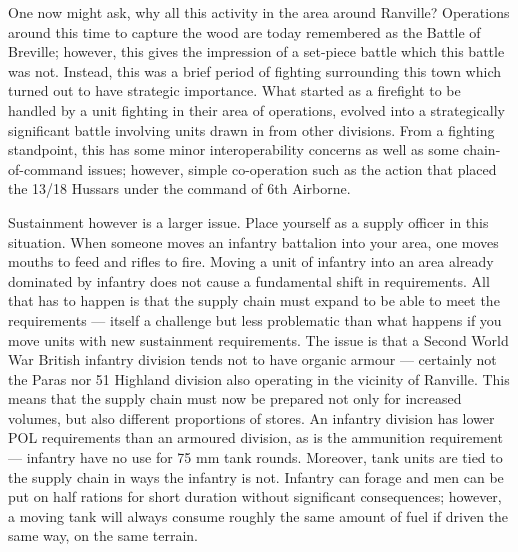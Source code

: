 \documentclass[noraggedright]{turabian-researchpaper}
\begin{document}

One now might ask, why all this activity in the area around Ranville?  
Operations around this time to capture the wood are today remembered as the
Battle of Breville; however, this gives the impression of a set-piece battle
which this battle was not.  Instead, this was a brief period of fighting
surrounding this town which turned out to have strategic importance.  What 
started as a firefight to be handled by a unit fighting in their area of 
operations, evolved into a strategically significant battle involving units
drawn in from other divisions.  From a fighting standpoint, this has some 
minor interoperability concerns as well as some chain-of-command issues; 
however, simple co-operation such as the action that placed the 13/18
Hussars under the command of 6th Airborne.  

Sustainment however is a larger issue.  Place yourself as a supply officer in
this situation.  When someone moves an infantry battalion into your area,
one moves mouths to feed and rifles to fire.  Moving a unit of infantry into
an area already dominated by infantry does not cause a fundamental shift in
requirements.  All that has to happen is that the supply chain must expand to
be able to meet the requirements --- itself a challenge but less problematic
than what happens if you move units with new sustainment requirements. The 
issue is that a Second World War British infantry division tends not to have
organic armour --- certainly not the Paras nor 51 Highland division also
operating in the vicinity of Ranville.  This means that the supply chain 
must now be prepared not only for increased volumes, but also different 
proportions of stores.  An infantry division has lower POL requirements than
an armoured division, as is the ammunition requirement --- infantry have no
use for 75 mm tank rounds.  Moreover, tank units are tied to the supply chain
in ways the infantry is not.  Infantry can forage and men can be put on half
rations for short duration without significant consequences; however, a 
moving tank will always consume roughly the same amount of fuel if driven the 
same way, on the same terrain.  
\end{document}
